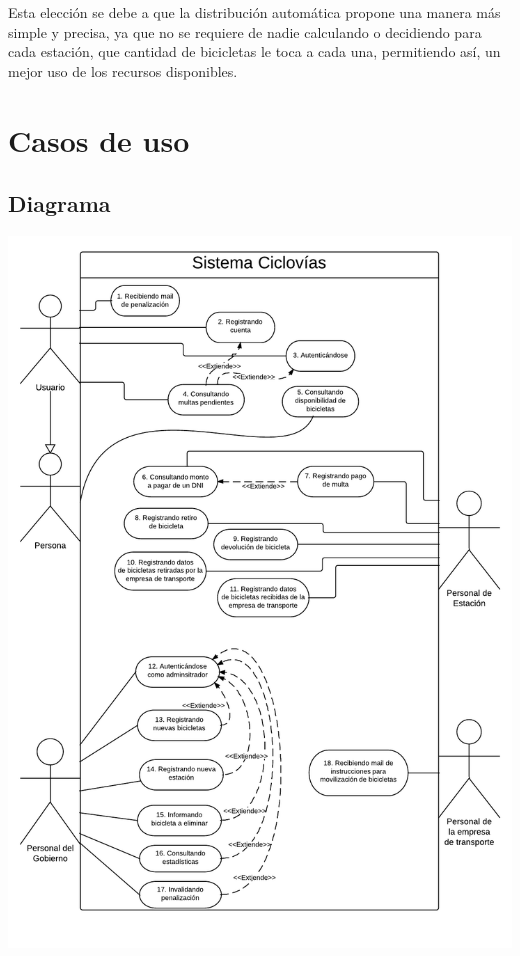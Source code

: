 \documentclass[a4paper, 10pt, twoside]{article}
\begin{document}
Esta elección se debe a que la distribución automática propone una manera más simple y precisa, ya que no se requiere de nadie calculando o decidiendo para cada estación, que cantidad de bicicletas le toca a cada una, permitiendo así, un mejor uso de los recursos disponibles.



\newpage
\section{Casos de uso}

\subsection{Diagrama}
\includegraphics[width=16cm]{diagramas/cu.pdf}
\end{document}
